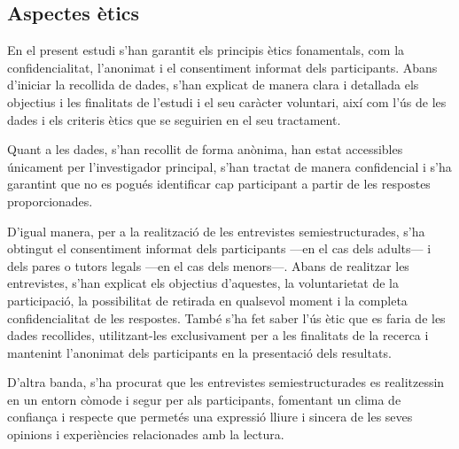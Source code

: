 \documentclass[12pt]{article}
\begin{document}


\subsection{Aspectes ètics}

En el present estudi s'han garantit els principis ètics fonamentals, com la confidencialitat, l’anonimat i el consentiment informat dels participants. Abans d’iniciar la recollida de dades, s’han explicat de manera clara i detallada els objectius i les finalitats de l’estudi i el seu caràcter voluntari, així com l’ús de les dades i els criteris ètics que se seguirien en el seu tractament.

Quant a les dades, s'han recollit de forma anònima, han estat accessibles únicament per l’investigador principal, s'han tractat de manera confidencial i s'ha garantint que no es pogués identificar cap participant a partir de les respostes proporcionades.

D'igual manera, per a la realització de les entrevistes semiestructurades, s'ha obtingut el consentiment informat dels participants ---en el cas dels adults--- i dels pares o tutors legals ---en el cas dels menors---. Abans de realitzar les entrevistes, s'han explicat els objectius d'aquestes, la voluntarietat de la participació, la possibilitat de retirada en qualsevol moment i la completa confidencialitat de les respostes. També s'ha fet saber l'ús ètic que es faria de les dades recollides, utilitzant-les exclusivament per a les finalitats de la recerca i mantenint l'anonimat dels participants en la presentació dels resultats.

D'altra banda, s'ha procurat que les entrevistes semiestructurades es realitzessin en un entorn còmode i segur per als participants, fomentant un clima de confiança i respecte que permetés una expressió lliure i sincera de les seves opinions i experiències relacionades amb la lectura.
\end{document}
